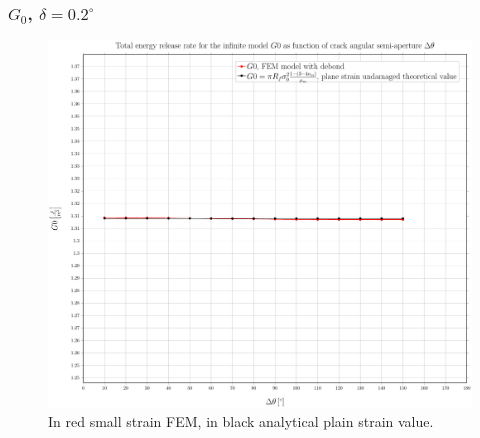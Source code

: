 \documentclass[first,firstsupp,lastsupp,handout,last,hyperref,table]{ETHclass}
\begin{document}
\begin{frame}
\frametitle{\small $G_{0}$, $\delta=0.2^{\circ}$}
\vspace{-0.5cm}
\centering
\captionsetup[figure]{font=scriptsize,labelfont=scriptsize}
\begin{figure}[!h]
\centering
\includegraphics[height=0.7\textheight]{2017-07-10_AbqRunSummary_SmallStrainD02_G0_Summary.pdf}
  \caption{\scriptsize In red small strain FEM, in black analytical plain strain value.}
  \label{fig:res1}
\end{figure}
\end{frame}

\end{document}

